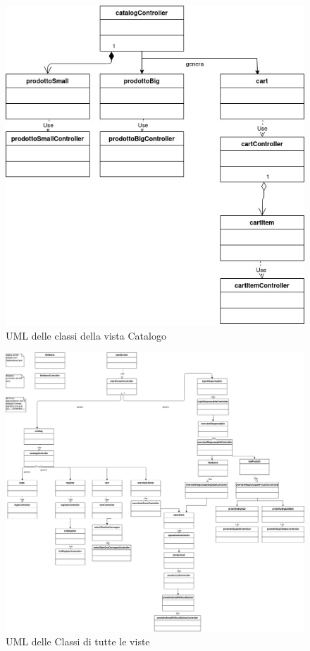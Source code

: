 \documentclass{article}
\begin{document}
\begin{figure}[h!]
	\centering
	\includegraphics[width=\textwidth]{UmlCatalog.jpg}
	\caption{UML delle classi della vista Catalogo}
	\label{fig:UmlCatalog}
\end{figure}

\begin{figure}[h!]
	\centering
	\includegraphics[width=\textwidth]{UmlInterfaccie.jpg}
	\caption{UML delle Classi di tutte le viste}
	\label{fig:UmlInterfaccie}
\end{figure}
\end{document}
